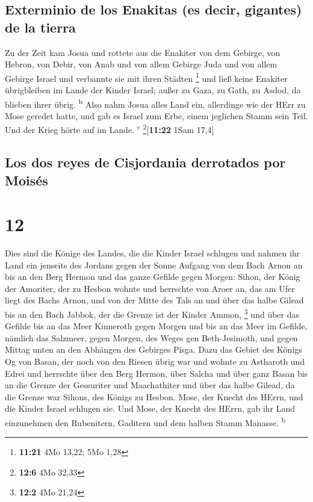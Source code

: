 \hypertarget{exterminio-de-los-enakitas-es-decir-gigantes-de-la-tierra}{%
\subsection{Exterminio de los Enakitas (es decir, gigantes) de la
tierra}\label{exterminio-de-los-enakitas-es-decir-gigantes-de-la-tierra}}

 Zu der Zeit kam Josua und rottete aus die Enakiter von
dem Gebirge, von Hebron, von Debir, von Anab und von allem Gebirge Juda
und von allem Gebirge Israel und verbannte sie mit ihren Städten
\footnote{\textbf{11:21} 4Mo 13,22; 5Mo 1,28}  und ließ
keine Enakiter übrigbleiben im Lande der Kinder Israel; außer zu Gaza,
zu Gath, zu Asdod, da blieben ihrer übrig. \textsuperscript{b}
 Also nahm Josua alles Land ein, allerdinge wie der HErr
zu Mose geredet hatte, und gab es Israel zum Erbe, einem jeglichen Stamm
sein Teil. Und der Krieg hörte auf im Lande. \textsuperscript{c}
\footnote{\textbf{12:6} 4Mo 32,33}{[}\textbf{11:22} 1Sam 17,4{]}

\hypertarget{los-dos-reyes-de-cisjordania-derrotados-por-moisuxe9s}{%
\subsection{Los dos reyes de Cisjordania derrotados por
Moisés}\label{los-dos-reyes-de-cisjordania-derrotados-por-moisuxe9s}}

\hypertarget{section-11}{%
\section{12}\label{section-11}}

 Dies sind die Könige des Landes, die die Kinder Israel
schlugen und nahmen ihr Land ein jenseits des Jordans gegen der Sonne
Aufgang von dem Bach Arnon an bis an den Berg Hermon und das ganze
Gefilde gegen Morgen:  Sihon, der König der Amoriter, der
zu Hesbon wohnte und herrschte von Aroer an, das am Ufer liegt des Bachs
Arnon, und von der Mitte des Tals an und über das halbe Gilead bis an
den Bach Jabbok, der die Grenze ist der Kinder Ammon, \footnote{\textbf{12:2}
  4Mo 21,24}  und über das Gefilde bis an das Meer
Kinneroth gegen Morgen und bis an das Meer im Gefilde, nämlich das
Salzmeer, gegen Morgen, des Weges gen Beth-Jesimoth, und gegen Mittag
unten an den Abhängen des Gebirges Pisga.  Dazu das Gebiet
des Königs Og von Basan, der noch von den Riesen übrig war und wohnte zu
Astharoth und Edrei  und herrschte über den Berg Hermon,
über Salcha und über ganz Basan bis an die Grenze der Gessuriter und
Maachathiter und über das halbe Gilead, da die Grenze war Sihons, des
Königs zu Hesbon.  Mose, der Knecht des HErrn, und die
Kinder Israel schlugen sie. Und Mose, der Knecht des HErrn, gab ihr Land
einzunehmen den Rubenitern, Gaditern und dem halben Stamm Manasse.
\textsuperscript{b}

